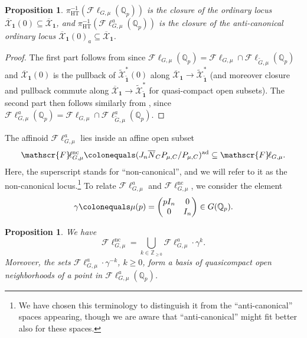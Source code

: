\documentclass{amsart}
\newtheorem{prop}[subsubsection]{Proposition}
\theoremstyle{remark}
\numberwithin{equation}{subsection}
\newcommand{\Q}{\QQ}
\newcommand{\Z}{\ZZ}
\newcommand{\QQ}{{\mathbb Q}}
\newcommand{\ZZ}{{\mathbb Z}}
\newcommand{\cX}{{\mathcal X}}
\newcommand{\Qp}{\Q_p}
\newcommand{\mbf}{\mathbf}
\newcommand{\Fl}{\mathscr{F}\!\ell}
\newcommand{\ad}{\mathrm{ad}}
\newcommand{\tG}{\widetilde{G}}
\newcommand{\ocX}{\overline{\mathcal{X}}}
\newcommand{\nc}{\mathrm{nc}}
\newcommand{\ol}{\overline}
\newcommand{\wt}{\widetilde}
\newcommand{\sub}{\subseteq}
\newcommand{\defeq}{\colonequals}
\renewcommand{\(}{\left(}
\renewcommand{\)}{\right)}
\begin{document}
\begin{prop}\label{explicit description of ordinary stratum} $\pi_{\mathrm{HT}}^{-1}(\Fl_{G,\mu}(\Q_p))$ is the closure of the ordinary locus $\ocX_{\mbf{1}}(0) \sub \ocX_{\mbf{1}}$, and $\pi_{\mathrm{HT}}^{-1}(\Fl^a_{G,\mu}(\Q_p))$ is the closure of the anti-canonical ordinary locus $\ocX_{\mbf{1}}(0)_{a}\sub \ocX_{\mbf{1}}$.
\end{prop}

\begin{proof}
The first part follows from \cite[Lemma 3.3.19]{scholze-galois} since $\Fl_{G,\mu}(\Qp)=\Fl_{G,\mu}\cap \Fl_{\tG,\mu}(\Qp)$ and $\ocX_{\mbf{1}}(0)$ is the pullback of $ \wt{\cX}^\ast_{\wt{\mbf{1}}}(0)$ along $\ocX_{\mbf{1}} \to \wt{\cX}^\ast_{\wt{\mbf{1}}}$ (and moreover closure and pullback commute along $\ocX_{\mbf{1}} \to \wt{\cX}^\ast_{\wt{\mbf{1}}}$ for quasi-compact open subsets). The second part then follows similarly from \cite[Lemma 3.3.20]{scholze-galois}, since $\Fl_{G,\mu}^{a}(\Qp)= \Fl_{G,\mu} \cap \Fl_{\tG,\mu}^a (\Qp)$.
\end{proof}  

The affinoid $\Fl_{G,\mu}^a$ lies inside an affine open subset 
$$ \Fl_{G,\mu}^{\mathrm{nc}} \defeq (J_n \ol{N}_C P_{\mu,C}/ P_{\mu,C} )^{\ad} \sub \Fl_{G,\mu}. $$
Here, the superscript stands for ``non-canonical'', and we will refer to it as the non-canonical locus.\footnote{We have chosen this terminology to distinguish it from the ``anti-canonical'' spaces appearing, though we are aware that ``anti-canonical'' might fit better also for these spaces.} To relate $\Fl_{G,\mu}^{a}$ and $\Fl_{G,\mu}^{\nc}$, we consider the element 
\[
\gamma \defeq \mu(p) = \begin{pmatrix} pI_n & 0 \\ 0 & I_n \end{pmatrix} \in G(\Qp).
\]

\begin{prop}\label{cover of flag nc}
We have 
\[
\Fl_{G,\mu}^{\mathrm{nc}}=\bigcup_{k\in\Z_{\geq 0}}\Fl_{G,\mu}^{a}\cdot\gamma^{k}.
\]
Moreover, the sets $\Fl_{G,\mu}^{a}\cdot \gamma^{-k}$, $k\geq 0$, form a basis of quasicompact open neighborhoods of a point in $\Fl_{G,\mu}^{a}(\Qp)$.
\end{prop}
\end{document}
